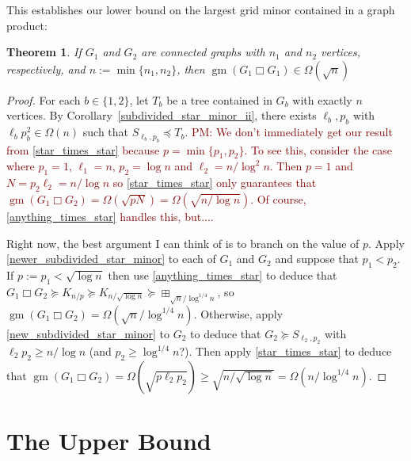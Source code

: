 \documentclass[kpfonts,lotsofwhite]{patmorin}
\newcommand{\boxprod}{\mathbin{\Box}}
\renewcommand{\ge}{\geqslant}
\DeclareMathOperator{\gm}{gm}
\newcommand{\pat}[1]{\textcolor{Maroon}{PM: #1}}
\theoremstyle{plain}
\newtheorem{thm}{Theorem}
\theoremstyle{definition}
\begin{document}
This establishes our lower bound on the largest grid minor contained in a graph product:

\begin{thm}\label{lower_bound}
  If $G_1$ and $G_2$ are connected graphs with $n_1$ and $n_2$ vertices, respectively, and $n:=\min\{n_1,n_2\}$, then $\gm(G_1\boxprod G_1)\in\Omega(\sqrt{n})$
\end{thm}

\begin{proof}
  For each $b\in\{1,2\}$, let $T_b$ be a tree contained in $G_b$ with exactly $n$ vertices.  By Corollary~\ref{subdivided_star_minor_ii}, there exists $\ell_b,p_b$ with $\ell_b p_b^2\in\Omega(n)$ such that $S_{\ell_b,p_b}\preceq T_b$. \pat{We don't immediately get our result from \cref{star_times_star} because $p=\min\{p_1,p_2\}$.  To see this, consider the case where $p_1=1$, $\ell_1=n$, $p_2=\log n$ and $\ell_2=n/\log^2 n$.  Then $p=1$ and $N=p_2\ell_2=n/\log n$ so \cref{star_times_star} only guarantees that $\gm(G_1\boxprod G_2)=\Omega(\sqrt{p N})=\Omega(\sqrt{n/\log n})$.  Of course, \cref{anything_times_star} handles this, but....}

  Right now, the best argument I can think of is to branch on the value of $p$.  Apply \cref{newer_subdivided_star_minor} to each of $G_1$ and $G_2$ and suppose that $p_1< p_2$.  If $p:=p_1 < \sqrt{\log n}$ then use \cref{anything_times_star} to deduce that $G_1\boxprod G_2\succeq K_{n/p}\succeq K_{n/\sqrt{\log n}}\succeq \boxplus_{\sqrt{n}/\log^{1/4} n}$, so $\gm(G_1\boxprod G_2)=\Omega(\sqrt{n}/\log^{1/4} n)$.  Otherwise, apply \cref{new_subdivided_star_minor} to $G_2$ to deduce that $G_2\succeq S_{\ell_2,p_2}$ with $\ell_2p_2 \ge n/\log n$ (and $p_2\ge \log^{1/4} n$?).  Then apply \cref{star_times_star} to deduce that $\gm(G_1\boxprod G_2)=\Omega(\sqrt{p\ell_2p_2}) \ge \sqrt{n/\sqrt{\log n}}=\Omega(n/\log^{1/4} n)$.

\end{proof}

\section{The Upper Bound}
\end{document}
